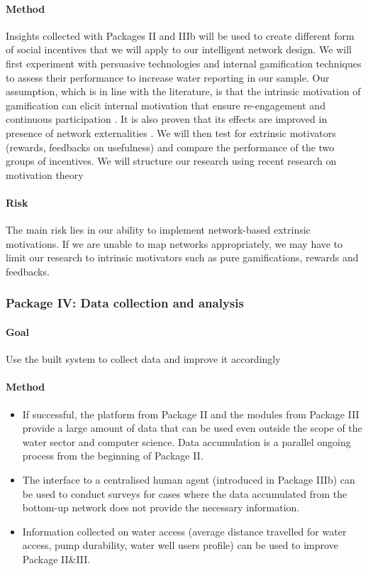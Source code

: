 \documentclass[11pt]{article}
\begin{document}
\paragraph{Method}
Insights collected with Packages II and IIIb will be used to create different form of social incentives that we will apply to our intelligent network design. We will first experiment with persuasive technologies \citep{Oinas_Kukkonen2010, fogg2002persuasive} and internal gamification techniques \citep{blaschkeextrinsic, crowley2012gamification} to assess their performance to increase water reporting in our sample. Our assumption, which is in line with the literature, is that the intrinsic motivation of gamification can elicit internal motivation that ensure re-engagement and continuous participation \citep{lin2008elucidating, ling2005using}. It is also proven that its effects are improved in presence of network externalities \citep{lin2011people}. We will then test for extrinsic motivators (rewards, feedbacks on usefulness) and compare the performance of the two groups of incentives. We will structure our research using recent research on motivation theory \citep{davis1992extrinsic, kim2007value}
\paragraph{Risk}
The main risk lies in our ability to implement network-based extrinsic motivations. If we are unable to map networks appropriately, we may have to limit our research to intrinsic motivators such as pure gamifications, rewards and feedbacks. 

\subsubsection*{Package IV: Data collection and analysis}
\paragraph{Goal} Use the built system to collect data and improve it accordingly
\paragraph{Method}

\begin{itemize}
 \item If successful, the platform from Package II and the modules from Package III provide a large amount of data that can be used even outside the scope of the water sector and computer science. Data accumulation is a parallel ongoing process from the beginning of Package II.
 \item The interface to a centralised human agent (introduced in Package IIIb) can be used to conduct surveys for cases where the data accumulated from the bottom-up network does not provide the necessary information.
 
 \item Information collected on water access (average distance travelled for water access, pump durability, water well users profile) can be used to improve Package II\&III.
 
 
\end{itemize}
\end{document}

